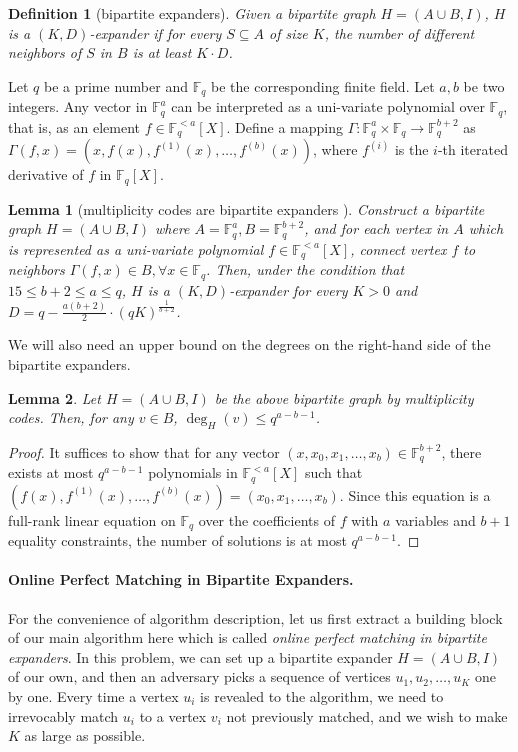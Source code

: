 \documentclass[11pt,a4paper]{article}
\newtheorem{lemma}{Lemma}[section]
\newtheorem{definition}{Definition}[section]
\newcommand{\field}{\mathbb{F}}
\begin{document}
\begin{definition}[bipartite expanders]
	Given a bipartite graph $H = (A\cup B, I)$, $H$ is a $(K, D)$-expander if for every $S\subseteq A$ of size $K$, the number of different neighbors of $S$ in $B$ is at least $K\cdot D$.
\end{definition}

Let $q$ be a prime number and $\field_q$ be the corresponding finite field. Let $a, b$ be two integers. Any vector in $\field_q^a$ can be interpreted as a uni-variate polynomial over $\field_q$, that is, as an element $f\in \field_q^{<a}[X]$. Define a mapping $\Gamma: \field_q^a\times \field_q\rightarrow \field_q^{b+2}$ as $\Gamma(f, x) = \left(x, f(x), f^{(1)}(x), \ldots, f^{(b)}(x)\right)$, where $f^{(i)}$ is the $i$-th iterated derivative of $f$ in $\field_q[X]$. 

\begin{lemma}[multiplicity codes are bipartite expanders \cite{kalev2022unbalanced}]\label{multi}
	Construct a bipartite graph $H = (A\cup B, I)$ where $A = \field_q^a, B = \field_q^{b+2}$, and for each vertex in $A$ which is represented as a uni-variate polynomial $f\in \field_q^{<a}[X]$, connect vertex $f$ to neighbors $\Gamma(f, x)\in B, \forall x\in \field_q$. Then, under the condition that $15\leq b+2\leq a\leq q$, $H$ is a $(K, D)$-expander for every $K>0$ and $D = q - \frac{a(b+2)}{2}\cdot (qK)^{\frac{1}{b+2}}$.
\end{lemma}

We will also need an upper bound on the degrees on the right-hand side of the bipartite expanders.
\begin{lemma}\label{deg}
	Let $H = (A\cup B, I)$ be the above bipartite graph by multiplicity codes. Then, for any $v\in B$, $\deg_H(v)\leq q^{a-b-1}$. 
\end{lemma}
\begin{proof}
	It suffices to show that for any vector $(x, x_0, x_1, \ldots, x_b)\in \field_q^{b+2}$, there exists at most $q^{a-b-1}$ polynomials in $\field_q^{<a}[X]$ such that $\left(f(x), f^{(1)}(x), \ldots, f^{(b)}(x)\right) = (x_0, x_1, \ldots, x_b)$. Since this equation is a full-rank linear equation on $\field_q$ over the coefficients of $f$ with $a$ variables and $b+1$ equality constraints, the number of solutions is at most $q^{a-b-1}$.
\end{proof}

\paragraph*{Online Perfect Matching in Bipartite Expanders.}
For the convenience of algorithm description, let us first extract a building block of our main algorithm here which is called \emph{online perfect matching in bipartite expanders}. In this problem, we can set up a bipartite expander $H = (A\cup B, I)$ of our own, and then an adversary picks a sequence of vertices $u_1, u_2, \ldots, u_K$ one by one. Every time a vertex $u_i$ is revealed to the algorithm, we need to irrevocably match $u_i$ to a vertex $v_i$ not previously matched, and we wish to make $K$ as large as possible.
\end{document}
